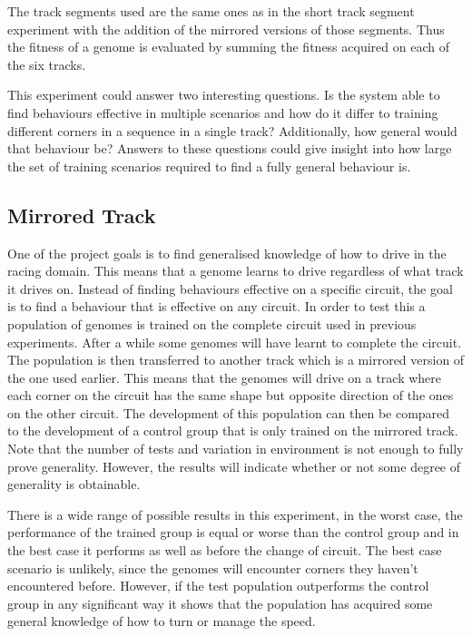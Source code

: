 The track segments used are the same ones as in the short track segment experiment with the addition of the mirrored versions of those segments. Thus the fitness of a genome is evaluated by summing the fitness acquired on each of the six tracks.

This experiment could answer two interesting questions. Is the system able to find behaviours effective in multiple scenarios and how do it differ to training different corners in a sequence in a single track? Additionally, how general would that behaviour be? Answers to these questions could give insight into how large the set of training scenarios required to find a fully general behaviour is. 


\subsection{Mirrored Track}
\label{method:mirror}
One of the project goals is to find generalised knowledge of how to drive in the racing domain. This means that a genome learns to drive regardless of what track it drives on. Instead of finding behaviours effective on a specific circuit, the goal is to find a behaviour that is effective on any circuit. In order to test this a population of genomes is trained on the complete circuit used in previous experiments. After a while some genomes will have learnt to complete the circuit. The population is then transferred to another track which is a mirrored version of the one used earlier. This means that the genomes will drive on a track where each corner on the circuit has the same shape but opposite direction of the ones on the other circuit. The development of this population can then be compared to the development of a control group that is only trained on the mirrored track. Note that the number of tests and variation in environment is not enough to fully prove generality. However, the results will indicate whether or not some degree of generality is obtainable. 



There is a wide range of possible results in this experiment, in the worst case, the performance of the trained group is equal or worse than the control group and in the best case it performs as well as before the change of circuit. The best case scenario is unlikely, since the genomes will encounter corners they haven't encountered before. However, if the test population outperforms the control group in any significant way it shows that the population has acquired some general knowledge of how to turn or manage the speed. 

